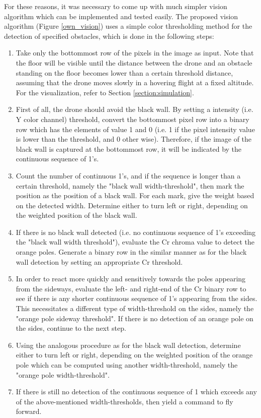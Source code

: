 For these reasons, it was necessary to come up with much simpler vision algorithm which can be implemented and tested easily. The proposed vision algorithm (Figure \ref{own_vision}) uses a simple color thresholding method for the detection of specified obstacles, which is done in the following steps:
\begin{enumerate}
	\item Take only the bottommost row of the pixels in the image as input. Note that the floor will be visible until the distance between the drone and an obstacle standing on the floor becomes lower than a certain threshold distance, assuming that the drone moves slowly in a hovering flight at a fixed altitude. For the visualization, refer to Section \ref{section:simulation}.
	\item First of all, the drone should avoid the black wall. By setting a intensity (i.e. Y color channel)  threshold, convert the bottommost pixel row into a binary row which has the elements of value 1 and 0 (i.e. 1 if the pixel intensity value is lower than the threshold, and 0 other wise). Therefore, if the image of the black wall is captured at the bottommost row, it will be indicated by the continuous sequence of 1's.
	\item Count the number of continuous 1's, and if the sequence is longer than a certain threshold, namely the "black wall width-threshold", then mark the position as the position of a black wall. For each mark, give the weight based on the detected width. Determine either to turn left or right, depending on the weighted position of the black wall. 
	\item If there is no black wall detected (i.e. no continuous sequence of 1's exceeding the "black wall width threshold"), evaluate the Cr chroma value to detect the orange poles. Generate a binary row in the similar manner as for the black wall detection by setting an appropriate Cr threshold. 
	\item In order to react more quickly and sensitively towards the poles appearing from the sideways, evaluate the left- and right-end of the Cr binary row to see if there is any shorter continuous sequence of 1's appearing from the sides. This necessitates a different type of width-threshold on the sides, namely the "orange pole sideway threshold". If there is no detection of an orange pole on the sides, continue to the next step.
	\item Using the analogous procedure as for the black wall detection, determine either to turn left or right, depending on the weighted position of the orange pole which can be computed using another width-threshold, namely the "orange pole width-threshold".
	\item If there is still no detection of the continuous sequence of 1 which exceeds any of the above-mentioned width-thresholds, then yield a command to fly forward.
\end{enumerate}


